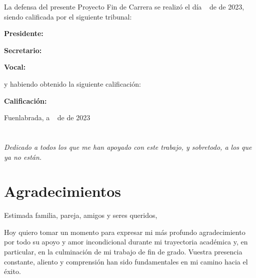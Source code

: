 \documentclass[a4paper, 12pt]{book}
\begin{document}
	\vspace{1cm}
	La defensa del presente Proyecto Fin de Carrera se realizó el día \qquad$\;\,$ de \qquad\qquad\qquad\qquad \newline de 2023, siendo calificada por el siguiente tribunal:
	
	
	\vspace{0.5cm}
	\textbf{Presidente:}
	
	\vspace{1.2cm}
	\textbf{Secretario:}
	
	\vspace{1.2cm}
	\textbf{Vocal:}
	
	
	\vspace{1.2cm}
	y habiendo obtenido la siguiente calificación:
	
	\vspace{1cm}
	\textbf{Calificación:}
	
	
	\vspace{1cm}
	\begin{flushright}
		Fuenlabrada, a \qquad$\;\,$ de \qquad\qquad\qquad\qquad de 2023
	\end{flushright}
	
	
	\chapter*{}
	\begin{flushright}
		\textit{Dedicado a todos los que me han apoyado con este trabajo, y sobretodo, a los que ya no están.}
	\end{flushright}
	
	
	\chapter*{Agradecimientos}
	
	Estimada familia, pareja, amigos y seres queridos,
	
	Hoy quiero tomar un momento para expresar mi más profundo agradecimiento por todo su apoyo y amor incondicional durante mi trayectoria académica y, en particular, en la culminación de mi trabajo de fin de grado. Vuestra presencia constante, aliento y comprensión han sido fundamentales en mi camino hacia el éxito.
	
\end{document}
